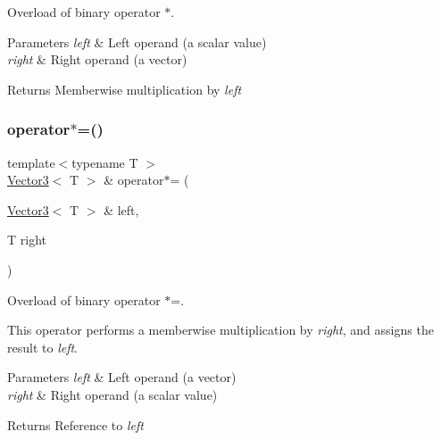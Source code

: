 Overload of binary operator $\ast$. 


\begin{DoxyParams}{Parameters}
{\em left} & Left operand (a scalar value) \\
\hline
{\em right} & Right operand (a vector)\\
\hline
\end{DoxyParams}
\begin{DoxyReturn}{Returns}
Memberwise multiplication by {\itshape left} 
\end{DoxyReturn}
\mbox{\label{classsf_1_1_vector3_ad5fb972775ce8ab58cd9670789e806a7}} 
\subsubsection{\texorpdfstring{operator$\ast$=()}{operator*=()}}
{\footnotesize\ttfamily template$<$typename T $>$ \\
\hyperlink{classsf_1_1_vector3}{Vector3}$<$ T $>$ \& operator$\ast$= (\begin{DoxyParamCaption}\item[{\hyperlink{classsf_1_1_vector3}{Vector3}$<$ T $>$ \&}]{left,  }\item[{T}]{right }\end{DoxyParamCaption})\hspace{0.3cm}{\ttfamily [related]}}



Overload of binary operator $\ast$=. 

This operator performs a memberwise multiplication by {\itshape right}, and assigns the result to {\itshape left}.


\begin{DoxyParams}{Parameters}
{\em left} & Left operand (a vector) \\
\hline
{\em right} & Right operand (a scalar value)\\
\hline
\end{DoxyParams}
\begin{DoxyReturn}{Returns}
Reference to {\itshape left} 
\end{DoxyReturn}
\mbox{\label{classsf_1_1_vector3_a6500a0cb00e07801e9e9d7e96852ddd3}} 
